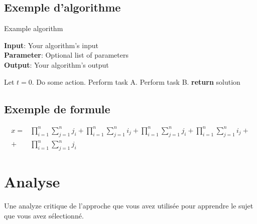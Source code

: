 \documentclass{article}
\begin{document}
\subsection{Exemple d'algorithme}

\begin{algorithm}[tb]
\caption{Example algorithm}
\label{alg:algorithm}
\textbf{Input}: Your algorithm's input\\
\textbf{Parameter}: Optional list of parameters\\
\textbf{Output}: Your algorithm's output
\begin{algorithmic}[1] %
\STATE Let $t=0$.
\STATE Do some action.
\STATE Perform task A.
\ELSE
\STATE Perform task B.
\ENDIF
\ENDWHILE
\STATE \textbf{return} solution
\end{algorithmic}
\end{algorithm}

\subsection{Exemple de formule}

\begin{align}
    x =& \prod_{i=1}^n \sum_{j=1}^n j_i + \prod_{i=1}^n \sum_{j=1}^n i_j + \prod_{i=1}^n \sum_{j=1}^n j_i + \prod_{i=1}^n \sum_{j=1}^n i_j + \nonumber\\
    + & \prod_{i=1}^n \sum_{j=1}^n j_i
\end{align}

\section{Analyse}

Une analyze critique de l'approche que vous avez utilisée pour apprendre le sujet que vous avez sélectionné.




\end{document}
